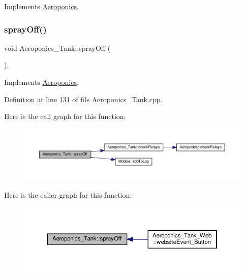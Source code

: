 Implements \hyperlink{class_aeroponics_a961b5818322eb6d0268d2f2f4763768e}{Aeroponics}.

\mbox{\label{class_aeroponics___tank_aa97abbd76332098f8662b78c451deee5}} 
\subsubsection{\texorpdfstring{spray\+Off()}{sprayOff()}\hspace{0.1cm}{\footnotesize\ttfamily [2/2]}}
{\footnotesize\ttfamily void Aeroponics\+\_\+\+Tank\+::spray\+Off (\begin{DoxyParamCaption}{ }\end{DoxyParamCaption})\hspace{0.3cm}{\ttfamily [protected]}, {\ttfamily [virtual]}}



Implements \hyperlink{class_aeroponics_a961b5818322eb6d0268d2f2f4763768e}{Aeroponics}.



Definition at line 131 of file Aeroponics\+\_\+\+Tank.\+cpp.

Here is the call graph for this function\+:
\nopagebreak
\begin{figure}[H]
\begin{center}
\leavevmode
\includegraphics[width=350pt]{class_aeroponics___tank_aa97abbd76332098f8662b78c451deee5_cgraph}
\end{center}
\end{figure}
Here is the caller graph for this function\+:
\nopagebreak
\begin{figure}[H]
\begin{center}
\leavevmode
\includegraphics[width=350pt]{class_aeroponics___tank_aa97abbd76332098f8662b78c451deee5_icgraph}
\end{center}
\end{figure}
\mbox{\label{class_aeroponics___tank_a0c9c9616ee380d0e4dd0ccc41d7e7a0f}} 
